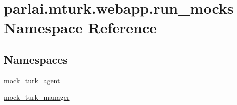 \hypertarget{namespaceparlai_1_1mturk_1_1webapp_1_1run__mocks}{}\section{parlai.\+mturk.\+webapp.\+run\+\_\+mocks Namespace Reference}
\label{namespaceparlai_1_1mturk_1_1webapp_1_1run__mocks}
\subsection*{Namespaces}
\begin{DoxyCompactItemize}
\item 
 \hyperlink{namespaceparlai_1_1mturk_1_1webapp_1_1run__mocks_1_1mock__turk__agent}{mock\+\_\+turk\+\_\+agent}
\item 
 \hyperlink{namespaceparlai_1_1mturk_1_1webapp_1_1run__mocks_1_1mock__turk__manager}{mock\+\_\+turk\+\_\+manager}
\end{DoxyCompactItemize}
